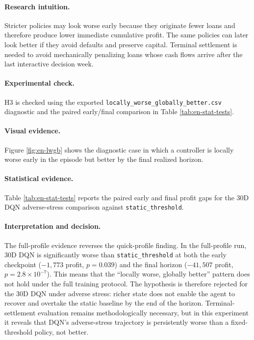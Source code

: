 \documentclass[12pt,a4paper]{article}
\begin{document}
\paragraph{Research intuition.}
Stricter policies may look worse early because they originate fewer loans and therefore produce lower immediate cumulative profit. The same policies can later look better if they avoid defaults and preserve capital. Terminal settlement is needed to avoid mechanically penalizing loans whose cash flows arrive after the last interactive decision week.

\paragraph{Experimental check.}
H3 is checked using the exported \texttt{locally\_worse\_globally\_better.csv} diagnostic and the paired early/final comparison in Table \ref{tab:en-stat-tests}.

\paragraph{Visual evidence.}
Figure \ref{fig:en-lwgb} shows the diagnostic case in which a controller is locally worse early in the episode but better by the final realized horizon.

\paragraph{Statistical evidence.}
Table \ref{tab:en-stat-tests} reports the paired early and final profit gaps for the 30D DQN adverse-stress comparison against \texttt{static\_threshold}.

\paragraph{Interpretation and decision.}
The full-profile evidence reverses the quick-profile finding. In the full-profile run, 30D DQN is significantly worse than \texttt{static\_threshold} at both the early checkpoint ($-1{,}773$ profit, $p = 0.039$) and the final horizon ($-41{,}507$ profit, $p = 2.8 \times 10^{-7}$). This means that the ``locally worse, globally better'' pattern does not hold under the full training protocol. The hypothesis is therefore rejected for the 30D DQN under adverse stress: richer state does not enable the agent to recover and overtake the static baseline by the end of the horizon. Terminal-settlement evaluation remains methodologically necessary, but in this experiment it reveals that DQN's adverse-stress trajectory is persistently worse than a fixed-threshold policy, not better.
\end{document}
